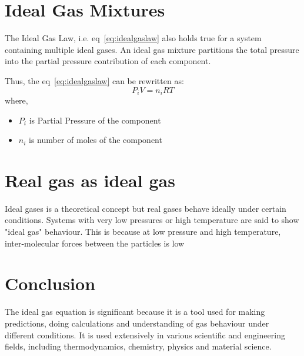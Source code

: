 \documentclass[16pt,a4paper]{article}
\begin{document}
\section{Ideal Gas Mixtures}
The Ideal Gas Law, i.e. eq~\ref{eq:idealgaslaw} also holds true for a system containing multiple ideal gases.
An ideal gas mixture partitions the total pressure into the partial pressure contribution of each component.


Thus, the eq~\ref{eq:idealgaslaw} can be rewritten as:
\begin{equation}
    P_{i}V = n_{i}RT
\end{equation}
where,
\begin{itemize}
    \item $P_{i}$ is Partial Pressure of the component
    \item $n_{i}$ is number of moles of the component
\end{itemize}



\section{Real gas as ideal gas}
Ideal gases is a theoretical concept but real gases behave ideally under certain conditions. Systems with very low pressures or high temperature are said to show "ideal gas" behaviour. This is because at low pressure and high temperature, inter-molecular forces between the particles is low

\section{Conclusion}
The ideal gas equation is significant because it is a tool used for making predictions, doing calculations and understanding of gas behaviour under different conditions. It is used extensively in various scientific and engineering fields, including thermodynamics, chemistry, physics and material science.



\end{document}
